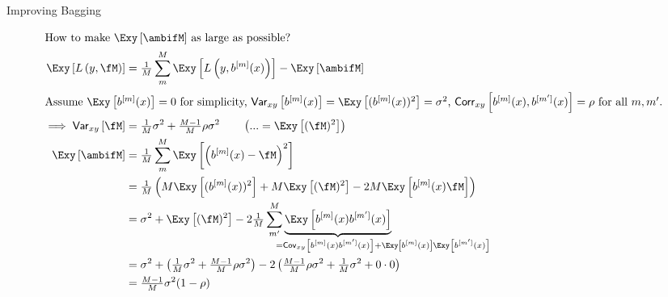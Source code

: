 \documentclass[11pt,compress,t,notes=noshow, xcolor=table]{beamer}
\begin{document}
\begin{vbframe}{Improving Bagging}
\begin{scriptsize}
\begin{align*}
\shortintertext{How to make $\Exy\left[\ambifM\right]$ as large as possible?}
\Exy\left[L\left(y, \fM \right)\right] &= \tfrac{1}{M}\sum^M_{m} \Exy\left[L\left(y, \blm \right)\right] - \Exy\left[\ambifM\right] \\
\shortintertext{Assume $\Exy\left[\blm\right] = 0$ for simplicity, $\var_{xy}\left[\blm\right] = \Exy\left[(\blm)^2\right] = \sigma^2$, $\corr_{xy}\left[\blm, \bl{m'}\right] = \rho$ for all $m, m'$.}
\implies 
\var_{xy}\left[\fM\right] &= \tfrac{1}{M} \sigma^2 +  \tfrac{M-1}{M} \rho \sigma^2 \qquad\left(... = \Exy\left[(\fM)^2\right]\right)\\
 \Exy\left[\ambifM\right] &= \tfrac{1}{M}\sum^M_{m} \Exy\left[\left(\blm- \fM\right)^2\right]\\
 & = \tfrac{1}{M}\left(M \Exy\left[(\blm)^2\right] + M \Exy\left[(\fM)^2\right] - 
     2 M \Exy\left[\blm\fM\right]\right) \\
  & = \sigma^2  + \Exy\left[(\fM)^2\right] - 2 \tfrac{1}{M}\sum^M_{m'} \underbrace{\Exy\left[\blm \bl{m'} \right]}_{\mathclap{\qquad\qquad\qquad\qquad= \cov_{xy}\left[\blm \bl{m'} \right] + \Exy\left[\blm\right]\Exy\left[\bl{m'}\right]}} \\
  &=  \sigma^2  + \left(\tfrac{1}{M} \sigma^2 +   \tfrac{M-1}{M} \rho \sigma^2\right) - 2\left(\tfrac{M-1}{M} \rho\sigma^2 + \tfrac{1}{M}\sigma^2 + 0 \cdot 0 \right)\\
  &= \tfrac{M-1}{M} \sigma^2 (1-\rho)
\end{align*}
\end{scriptsize}


\end{vbframe}
\end{document}
